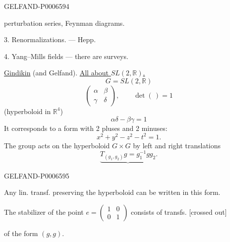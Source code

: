 \begin{GelfandAdjacentEvidence}{GELFAND-P000659}{4}

perturbation series, Feynman diagrams.

3. Renormalizations. --- Hepp.

4. Yang--Mills fields --- there are surveys.

\underline{Gindikin} (and Gelfand).
\underline{All about \(SL(2,\mathbb R)\).}
\[
G=SL(2,\mathbb R)
\]
\[
\begin{pmatrix}\alpha&\beta\\\gamma&\delta\end{pmatrix},
\qquad \det(\,)=1
\]
(hyperboloid in \(\mathbb R^4\))
\[
\alpha\delta-\beta\gamma=1
\]
It corresponds to a form with 2 pluses and 2 minuses:
\[
x^2+y^2-z^2-t^2=1.
\]
The group acts on the hyperboloid \(G\times G\) by left and right translations
\[
\underbrace{T_{(g_1,g_2)}g=g_1^{-1}gg_2}.
\]
\end{GelfandAdjacentEvidence}
\begin{GelfandAdjacentEvidence}{GELFAND-P000659}{5}


Any lin. transf. preserving the hyperboloid can be written in this form.

The stabilizer of the point \(e=\begin{pmatrix}1&0\\0&1\end{pmatrix}\)
consists of transfs. [crossed out]
\end{GelfandAdjacentEvidence}

of the form \((g,g)\).


